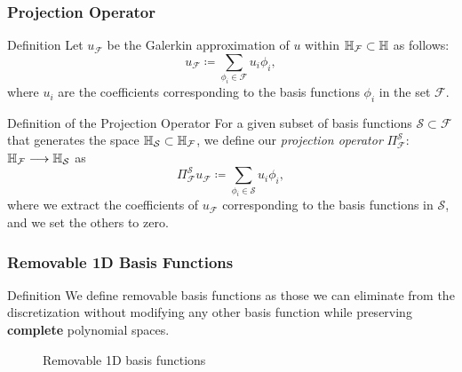 \begin{frame}
\frametitle{Projection Operator}
\begin{block}{Definition}
    Let \( u_{\mathcal{F}} \) be the Galerkin approximation of \( u \) within \( \mathbb{H}_{\mathcal{F}}  \subset \mathbb{H} \) as follows:
    \begin{equation}
       u_{\mathcal{F}} \coloneqq \sum_{\phi_{i} \in \mathcal{F}} u_{i} \phi_{i},
    \end{equation}
    where \( u_{i} \) are the coefficients corresponding to the basis functions \( \phi_{i} \) in the set \( \mathcal{F} \). 
    \end{block}
    \begin{block}{Definition of the Projection Operator}
        For a given subset of basis functions $\mathcal{S} \subset \mathcal{F}$ that generates the space $\mathbb{H}_{\mathcal{S}} \subset \mathbb{H}_{\mathcal{F}}$, we define our \emph{projection operator} $\Pi_{\mathcal{F}}^{\mathcal{S}}$: $\mathbb{H} _{\mathcal{F}} \longrightarrow \mathbb{H}_{\mathcal{S}}$ as
        \begin{equation}
            \Pi_{\mathcal{F}}^{\mathcal{S}} u_{\mathcal{F}} \coloneqq \sum_{\phi_{i} \in \mathcal{S}} u_{i} \phi_{i},
        \end{equation}
        where we extract the coefficients of $u_{\mathcal{F}}$ corresponding to the basis functions in $\mathcal{S}$, and we set the others to zero.
    \end{block}
\end{frame}

\begin{frame}
	\frametitle{Removable 1D Basis Functions}
	\begin{block}{Definition}
	We define {\color{blue} removable} basis functions as those we can eliminate from the discretization without modifying any other basis 	function while preserving \textbf{complete} polynomial spaces. 
	\end{block}
	\begin{figure}
	 \hspace{-1cm}
	\centering
	 
	\caption{Removable 1D basis functions}
	\end{figure}
\end{frame}

